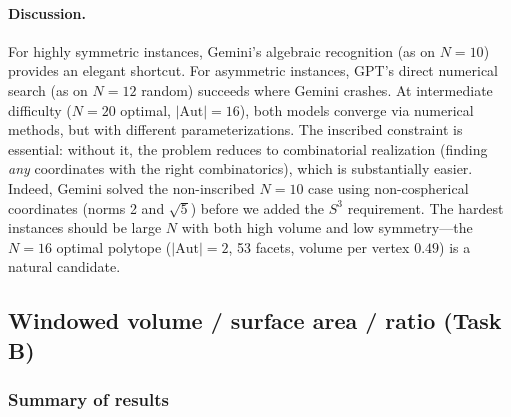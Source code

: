 \documentclass[11pt]{article}
\begin{document}
\paragraph{Discussion.}
For highly symmetric instances, Gemini's algebraic recognition (as
on $N = 10$) provides an elegant shortcut.  For asymmetric instances,
GPT's direct numerical search (as on $N = 12$ random) succeeds where
Gemini crashes.  At intermediate difficulty ($N = 20$ optimal,
$|\mathrm{Aut}| = 16$), both models converge via numerical methods,
but with different parameterizations.  The inscribed constraint is
essential: without it, the problem reduces to combinatorial
realization (finding \emph{any} coordinates with the right
combinatorics), which is substantially easier.  Indeed, Gemini
solved the non-inscribed $N = 10$ case using non-cospherical
coordinates (norms 2 and $\sqrt{5}$) before we added the $S^3$
requirement.  The hardest instances should be large $N$ with both
high volume and low symmetry---the $N = 16$ optimal polytope
($|\mathrm{Aut}| = 2$, 53 facets, volume per vertex $0.49$) is a
natural candidate.

\subsection{Windowed volume / surface area / ratio (Task B)}
\label{sec:windowed-results}

\subsubsection{Summary of results}
\end{document}
